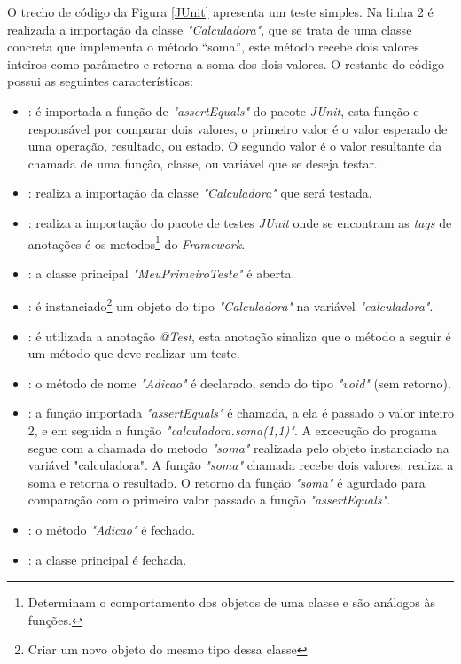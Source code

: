 O trecho de código da Figura \ref{JUnit} apresenta um teste simples. Na linha 2 é realizada a importação da classe \textit{"Calculadora"}, que se trata de uma classe concreta que implementa o método “soma”, este método recebe dois valores inteiros como parâmetro e retorna a soma dos dois valores.  O restante do código possui as seguintes características:

\begin{itemize}

\item[1]:  é importada a função de \textit{"assertEquals"} do pacote \textit{JUnit}, esta função e responsável por comparar dois valores, o primeiro valor é o valor esperado de uma operação, resultado, ou estado. O segundo valor é o valor resultante da chamada de uma função, classe, ou variável que se deseja testar. 

\item[2]: realiza a importação da classe \textit{"Calculadora"} que será testada. 

\item[3]: realiza a importação do pacote de testes \textit{JUnit} onde se encontram as \textit{tags} de anotações é os metodos\footnote{Determinam o comportamento dos objetos de uma classe e são análogos às funções.} do \textit{Framework}. 

\item[5]: a classe principal \textit{"MeuPrimeiroTeste"} é aberta. 

\item[7]: é instanciado\footnote{Criar um novo objeto do mesmo tipo dessa classe} um objeto do tipo \textit{"Calculadora"} na variável \textit{"calculadora"}. 

\item[9]: é utilizada a anotação \textit{@Test}, esta anotação sinaliza que o método a seguir é um método que deve realizar um teste. 

\item[10]: o método de nome \textit{"Adicao"} é declarado, sendo do tipo \textit{"void"} (sem retorno). 

\item[11]: a função importada \textit{"assertEquals"} é chamada, a ela é passado o valor inteiro 2, e em seguida a função \textit{"calculadora.soma(1,1)"}. A excecução do progama segue com a chamada do metodo  \textit{"soma"} realizada pelo objeto instanciado na variável "calculadora". A função \textit{"soma"} chamada recebe dois valores, realiza a soma e retorna o resultado. O retorno da função \textit{"soma"} é agurdado para comparação com o primeiro valor passado a função \textit{"assertEquals"}.

\item[12]: o método \textit{"Adicao"} é fechado.

\item[13]: a classe principal é fechada.

\end{itemize}

